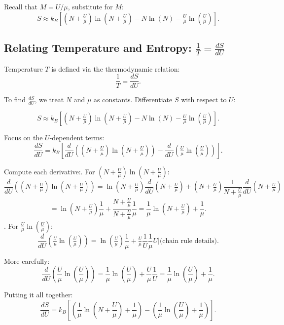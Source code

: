 \documentclass{report}
\begin{document}
Recall that $M = U/\mu$, substitute for $M$:
\[
S \approx k_B \left[ (N + \tfrac{U}{\mu})\ln\left(N + \tfrac{U}{\mu}\right) - N \ln(N) - \tfrac{U}{\mu}\ln\left(\tfrac{U}{\mu}\right) \right].
\]

\subsection*{Relating Temperature and Entropy: $\frac{1}{T} = \frac{dS}{dU}$}

Temperature $T$ is defined via the thermodynamic relation:
\[
\frac{1}{T} = \frac{dS}{dU}.
\]

To find $\frac{dS}{dU}$, we treat $N$ and $\mu$ as constants. Differentiate $S$ with respect to $U$:

\[
S \approx k_B \left[ (N + \tfrac{U}{\mu})\ln\left(N + \tfrac{U}{\mu}\right) - N \ln(N) - \tfrac{U}{\mu}\ln\left(\tfrac{U}{\mu}\right)\right].
\]

Focus on the $U$-dependent terms:
\[
\frac{dS}{dU} = k_B \left[ \frac{d}{dU}\left((N + \tfrac{U}{\mu})\ln\left(N + \tfrac{U}{\mu}\right)\right) - \frac{d}{dU}\left(\tfrac{U}{\mu}\ln\left(\tfrac{U}{\mu}\right)\right) \right].
\]

Compute each derivative:. For $(N + \tfrac{U}{\mu})\ln\left(N + \tfrac{U}{\mu}\right)$:
\[
\frac{d}{dU} \left((N + \tfrac{U}{\mu})\ln\left(N + \tfrac{U}{\mu}\right)\right) 
= \ln\left(N + \tfrac{U}{\mu}\right)\frac{d}{dU}(N + \tfrac{U}{\mu}) + (N+\tfrac{U}{\mu}) \frac{1}{N+\tfrac{U}{\mu}}\frac{d}{dU}(N+\tfrac{U}{\mu})
\]
\[
= \ln\left(N + \tfrac{U}{\mu}\right)\frac{1}{\mu} + \frac{N+\tfrac{U}{\mu}}{N+\tfrac{U}{\mu}}\frac{1}{\mu}
= \frac{1}{\mu}\ln\left(N + \tfrac{U}{\mu}\right) + \frac{1}{\mu}.
\]
. For $\tfrac{U}{\mu}\ln\left(\tfrac{U}{\mu}\right)$:
\[
\frac{d}{dU}\left(\tfrac{U}{\mu}\ln\left(\tfrac{U}{\mu}\right)\right) 
= \ln\left(\tfrac{U}{\mu}\right)\frac{1}{\mu} + \tfrac{U}{\mu}\frac{1}{U}\frac{1}{\mu}U\biggr| \text{(chain rule details)}.
\]

More carefully:
\[
\frac{d}{dU}\left(\frac{U}{\mu}\ln\left(\frac{U}{\mu}\right)\right) 
= \frac{1}{\mu}\ln\left(\frac{U}{\mu}\right) + \frac{U}{\mu}\frac{1}{U}
= \frac{1}{\mu}\ln\left(\frac{U}{\mu}\right) + \frac{1}{\mu}.
\]

Putting it all together:
\[
\frac{dS}{dU} = k_B\left[\left(\frac{1}{\mu}\ln\left(N + \frac{U}{\mu}\right) + \frac{1}{\mu}\right) - \left(\frac{1}{\mu}\ln\left(\frac{U}{\mu}\right) + \frac{1}{\mu}\right)\right].
\]
\end{document}
